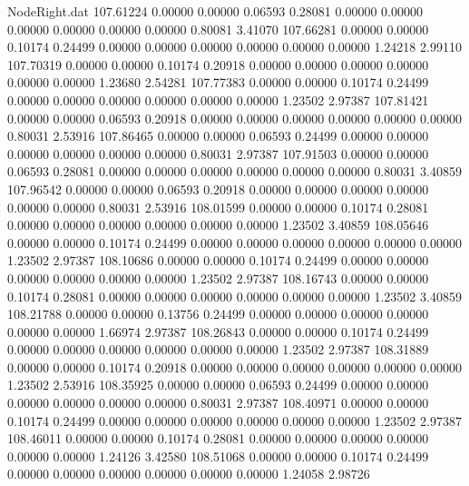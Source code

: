 \begin{filecontents}{NodeRight.dat}
 107.61224    0.00000    0.00000     0.06593    0.28081    0.00000    0.00000    0.00000    0.00000    0.00000    0.00000    0.80081    3.41070
 107.66281    0.00000    0.00000     0.10174    0.24499    0.00000    0.00000    0.00000    0.00000    0.00000    0.00000    1.24218    2.99110
 107.70319    0.00000    0.00000     0.10174    0.20918    0.00000    0.00000    0.00000    0.00000    0.00000    0.00000    1.23680    2.54281
 107.77383    0.00000    0.00000     0.10174    0.24499    0.00000    0.00000    0.00000    0.00000    0.00000    0.00000    1.23502    2.97387
 107.81421    0.00000    0.00000     0.06593    0.20918    0.00000    0.00000    0.00000    0.00000    0.00000    0.00000    0.80031    2.53916
 107.86465    0.00000    0.00000     0.06593    0.24499    0.00000    0.00000    0.00000    0.00000    0.00000    0.00000    0.80031    2.97387
 107.91503    0.00000    0.00000     0.06593    0.28081    0.00000    0.00000    0.00000    0.00000    0.00000    0.00000    0.80031    3.40859
 107.96542    0.00000    0.00000     0.06593    0.20918    0.00000    0.00000    0.00000    0.00000    0.00000    0.00000    0.80031    2.53916
 108.01599    0.00000    0.00000     0.10174    0.28081    0.00000    0.00000    0.00000    0.00000    0.00000    0.00000    1.23502    3.40859
 108.05646    0.00000    0.00000     0.10174    0.24499    0.00000    0.00000    0.00000    0.00000    0.00000    0.00000    1.23502    2.97387
 108.10686    0.00000    0.00000     0.10174    0.24499    0.00000    0.00000    0.00000    0.00000    0.00000    0.00000    1.23502    2.97387
 108.16743    0.00000    0.00000     0.10174    0.28081    0.00000    0.00000    0.00000    0.00000    0.00000    0.00000    1.23502    3.40859
 108.21788    0.00000    0.00000     0.13756    0.24499    0.00000    0.00000    0.00000    0.00000    0.00000    0.00000    1.66974    2.97387
 108.26843    0.00000    0.00000     0.10174    0.24499    0.00000    0.00000    0.00000    0.00000    0.00000    0.00000    1.23502    2.97387
 108.31889    0.00000    0.00000     0.10174    0.20918    0.00000    0.00000    0.00000    0.00000    0.00000    0.00000    1.23502    2.53916
 108.35925    0.00000    0.00000     0.06593    0.24499    0.00000    0.00000    0.00000    0.00000    0.00000    0.00000    0.80031    2.97387
 108.40971    0.00000    0.00000     0.10174    0.24499    0.00000    0.00000    0.00000    0.00000    0.00000    0.00000    1.23502    2.97387
 108.46011    0.00000    0.00000     0.10174    0.28081    0.00000    0.00000    0.00000    0.00000    0.00000    0.00000    1.24126    3.42580
 108.51068    0.00000    0.00000     0.10174    0.24499    0.00000    0.00000    0.00000    0.00000    0.00000    0.00000    1.24058    2.98726

\end{filecontents}
